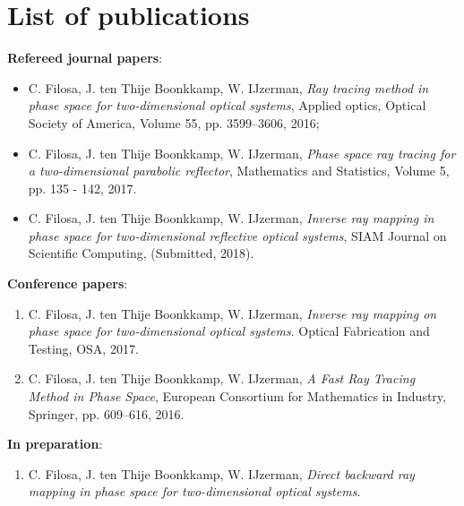 
\chapter*{List of publications}
\noindent \textbf{Refereed journal papers}:
\begin{itemize}
\item C. Filosa, J. ten Thije Boonkkamp, W. IJzerman,
\emph{Ray tracing method in phase space for two-dimensional optical systems}, Applied optics, Optical Society of America,
  Volume 55, pp. 3599--3606, 2016;

\item  C. Filosa, J. ten Thije Boonkkamp, W. IJzerman, 
  \emph{Phase space ray tracing for a two-dimensional parabolic reflector},
Mathematics and Statistics, Volume 5, pp. 135 - 142, 2017.
\item  C. Filosa, J. ten Thije Boonkkamp, W. IJzerman, \emph{Inverse ray mapping in phase space for two-dimensional reflective optical systems}, SIAM Journal on Scientific Computing, (Submitted, 2018).
\end{itemize}
\noindent \textbf{Conference papers}:
\begin{enumerate}
\item 
  C. Filosa, J. ten Thije Boonkkamp, W. IJzerman,  \emph{Inverse ray mapping on phase space for two-dimensional optical systems}.
  Optical Fabrication and Testing, OSA, 2017. 
\item  C. Filosa, J. ten Thije Boonkkamp, W. IJzerman, \emph{A Fast Ray Tracing Method in Phase Space}, European Consortium for Mathematics in Industry, Springer, pp. 609--616, 2016.
\end{enumerate}
\noindent \textbf{In preparation}:
\begin{enumerate}
\item  C. Filosa, J. ten Thije Boonkkamp, W. IJzerman, \emph{Direct backward ray mapping in phase space for two-dimensional optical systems}.
\end{enumerate}
